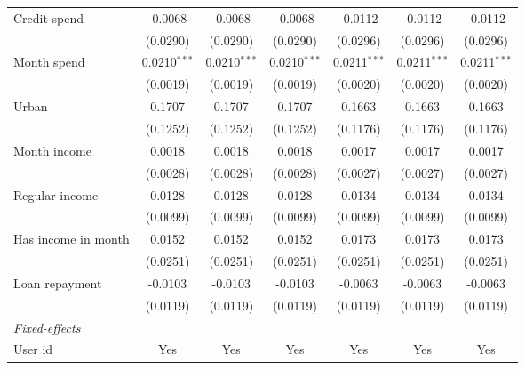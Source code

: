 \begin{table}[htbp]
\begin{threeparttable}[b]
\begin{tabular}{lcccccc}
         Credit spend              & -0.0068        & -0.0068        & -0.0068        & -0.0112        & -0.0112        & -0.0112\\   
                                   & (0.0290)       & (0.0290)       & (0.0290)       & (0.0296)       & (0.0296)       & (0.0296)\\   
         Month spend               & 0.0210$^{***}$ & 0.0210$^{***}$ & 0.0210$^{***}$ & 0.0211$^{***}$ & 0.0211$^{***}$ & 0.0211$^{***}$\\   
                                   & (0.0019)       & (0.0019)       & (0.0019)       & (0.0020)       & (0.0020)       & (0.0020)\\   
         Urban                     & 0.1707         & 0.1707         & 0.1707         & 0.1663         & 0.1663         & 0.1663\\   
                                   & (0.1252)       & (0.1252)       & (0.1252)       & (0.1176)       & (0.1176)       & (0.1176)\\   
         Month income              & 0.0018         & 0.0018         & 0.0018         & 0.0017         & 0.0017         & 0.0017\\   
                                   & (0.0028)       & (0.0028)       & (0.0028)       & (0.0027)       & (0.0027)       & (0.0027)\\   
         Regular income            & 0.0128         & 0.0128         & 0.0128         & 0.0134         & 0.0134         & 0.0134\\   
                                   & (0.0099)       & (0.0099)       & (0.0099)       & (0.0099)       & (0.0099)       & (0.0099)\\   
         Has income in month       & 0.0152         & 0.0152         & 0.0152         & 0.0173         & 0.0173         & 0.0173\\   
                                   & (0.0251)       & (0.0251)       & (0.0251)       & (0.0251)       & (0.0251)       & (0.0251)\\   
         Loan repayment            & -0.0103        & -0.0103        & -0.0103        & -0.0063        & -0.0063        & -0.0063\\   
                                   & (0.0119)       & (0.0119)       & (0.0119)       & (0.0119)       & (0.0119)       & (0.0119)\\   
         \midrule
         \emph{Fixed-effects}\\
         User id                   & Yes            & Yes            & Yes            & Yes            & Yes            & Yes\\  

\end{tabular}
\end{threeparttable}
\end{table}
